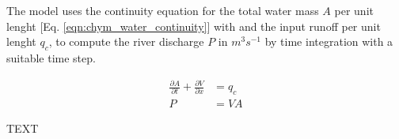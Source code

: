 \documentclass[journal abbreviation, manuscript]{copernicus}
\begin{document}
The model uses the continuity equation for the total water mass $A$ per unit
lenght [Eq. \ref{eqn:chym_water_continuity}] with and the input runoff per unit
lenght $q_c$, to compute the river discharge $P$ in $m^3 s^{-1}$ by time
integration with a suitable time step.

\begin{align}
    \label{eqn:chym_water_continuity}
    \frac{\partial A}{\partial t} + \frac{\partial V}{\partial x} &= q_c \\
    P &= V A
\end{align}

\noappendix       %




\appendixfigures  %

\appendixtables   %







\begin{acknowledgements}
TEXT
\end{acknowledgements}





\end{document}
